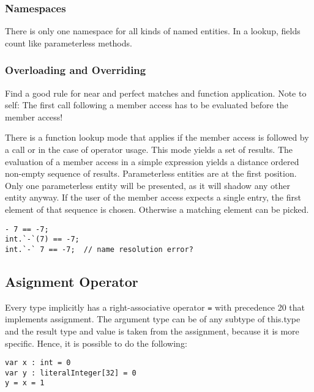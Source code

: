 \subsubsection{Namespaces}

There is only one namespace for all kinds of named entities.
In a lookup, fields count like parameterless methods.


\subsubsection{Overloading and Overriding}

Find a good rule for near and perfect matches and function application.
Note to self: The first call following a member access has to be evaluated before the member access!

There is a function lookup mode that applies if the member access is followed by a call or in the case of operator usage.
This mode yields a set of results. 
The evaluation of a member access in a simple expression yields a distance ordered non-empty sequence of results.
Parameterless entities are at the first position.
Only one parameterless entity will be presented, as it will shadow any other entity anyway.
If the user of the member access expects a single entry, the first element of that sequence is chosen.
Otherwise a matching element can be picked.



\begin{lstlisting}[language=tyr]
- 7 == -7;
int.`-`(7) == -7;
int.`-` 7 == -7;  // name resolution error?
\end{lstlisting}

\subsection{Asignment Operator}

Every type implicitly has a right-associative operator \texttt{=} with precedence 20 that implements assignment.
The argument type can be of any subtype of this.type and the result type and value is taken from the assignment, because it is more specific.
Hence, it is possible to do the following:
\begin{lstlisting}[language=tyr]
var x : int = 0
var y : literalInteger[32] = 0
y = x = 1
\end{lstlisting}


